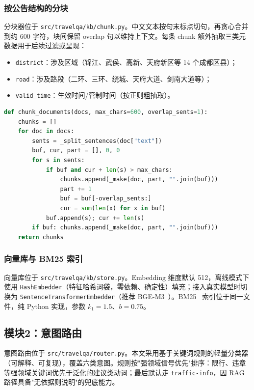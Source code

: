 \documentclass[bwprint]{report}
\begin{document}
\subsubsection{按公告结构的分块}
分块器位于 \texttt{src/travelqa/kb/chunk.py}。中文文本按句末标点切句，再贪心合并到约 600 字符，块间保留 overlap 句以维持上下文。每条 chunk 额外抽取三类元数据用于后续过滤或呈现：

\begin{itemize}
    \item \texttt{district}：涉及区域（锦江、武侯、高新、天府新区等 14 个成都区县）；
    \item \texttt{road}：涉及路段（二环、三环、绕城、天府大道、剑南大道等）；
    \item \texttt{valid\_time}：生效时间/管制时间（按正则粗抽取）。
\end{itemize}

\begin{lstlisting}[language=Python,caption={分块与元数据抽取（节选）}]
def chunk_documents(docs, max_chars=600, overlap_sents=1):
    chunks = []
    for doc in docs:
        sents = _split_sentences(doc["text"])
        buf, cur, part = [], 0, 0
        for s in sents:
            if buf and cur + len(s) > max_chars:
                chunks.append(_make(doc, part, "".join(buf)))
                part += 1
                buf = buf[-overlap_sents:]
                cur = sum(len(x) for x in buf)
            buf.append(s); cur += len(s)
        if buf: chunks.append(_make(doc, part, "".join(buf)))
    return chunks
\end{lstlisting}

\subsubsection{向量库与 BM25 索引}
向量库位于 \texttt{src/travelqa/kb/store.py}。Embedding 维度默认 512，离线模式下使用 \texttt{HashEmbedder}（特征哈希词袋，零依赖、确定性）填充；接入真实模型时切换为 \texttt{SentenceTransformerEmbedder}（推荐 BGE-M3~\cite{bge_m3}）。BM25~\cite{bm25} 索引位于同一文件，纯 Python 实现，参数 $k_1=1.5$、$b=0.75$。

\subsection{模块2：意图路由}
意图路由位于 \texttt{src/travelqa/router.py}。本文采用基于关键词规则的轻量分类器（可解释、可复现），覆盖六类意图。规则按"强领域信号优先"排序：限行、违章等强领域关键词优先于泛化的建议类动词；最后默认走 \texttt{traffic-info}，因 RAG 路径具备"无依据则说明"的兜底能力。
\end{document}
